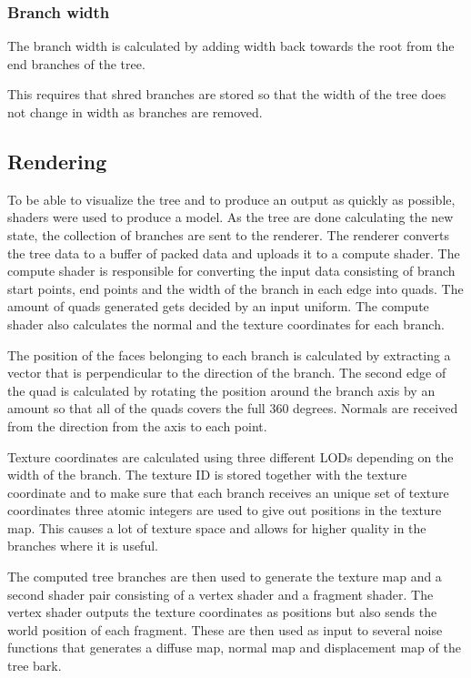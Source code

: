 \documentclass[11pt]{article} %
\begin{document}
\subsubsection{Branch width}
The branch width is calculated by adding width back towards the root from the end branches of the tree.

This requires that shred branches are stored so that the width of the tree does not change in width as branches are removed.

\subsection{Rendering}
To be able to visualize the tree and to produce an output as quickly as possible, shaders were used to produce a model.
As the tree are done calculating the new state, the collection of branches are sent to the renderer.
The renderer converts the tree data to a buffer of packed data and uploads it to a compute shader.
The compute shader is responsible for converting the input data consisting of branch start points, end points and the width of the branch in each edge into quads.
The amount of quads generated gets decided by an input uniform.
The compute shader also calculates the normal and the texture coordinates for each branch.

The position of the faces belonging to each branch is calculated by extracting a vector that is perpendicular to the direction of the branch.
The second edge of the quad is calculated by rotating the position around the branch axis by an amount so that all of the quads covers the full 360 degrees.
Normals are received from the direction from the axis to each point.

Texture coordinates are calculated using three different LODs depending on the width of the branch.
The texture ID is stored together with the texture coordinate and to make sure that each branch receives an unique set of texture coordinates three atomic integers are used to give out positions in the texture map.
This causes a lot of texture space and allows for higher quality in the branches where it is useful.

The computed tree branches are then used to generate the texture map and a second shader pair consisting of a vertex shader and a fragment shader.
The vertex shader outputs the texture coordinates as positions but also sends the world position of each fragment.
These are then used as input to several noise functions that generates a diffuse map, normal map and displacement map of the tree bark.
\end{document}
